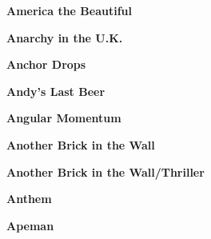 \newline
\vspace{10pt} 
\begin{center}\textbf{America the Beautiful}\end{center}
\newline
\vspace{10pt} 
\begin{center}\textbf{Anarchy in the U.K.}\end{center}
\newline
\vspace{10pt} 
\begin{center}\textbf{Anchor Drops}\end{center}
\newline
\vspace{10pt} 
\begin{center}\textbf{Andy's Last Beer}\end{center}
\newline
\vspace{10pt} 
\begin{center}\textbf{Angular Momentum}\end{center}
\newline
\vspace{10pt} 
\begin{center}\textbf{Another Brick in the Wall}\end{center}
\newline
\vspace{10pt} 
\begin{center}\textbf{Another Brick in the Wall/Thriller}\end{center}
\newline
\vspace{10pt} 
\begin{center}\textbf{Anthem}\end{center}
\newline
\vspace{10pt} 
\begin{center}\textbf{Apeman}\end{center}
\newline
